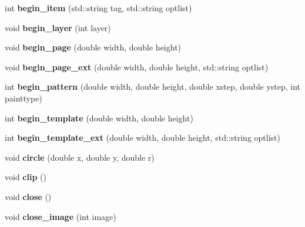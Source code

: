 \begin{DoxyCompactItemize}
\item 
\hypertarget{classPDFlib_a0df23d2d6f9a6a100878bad9b8936e6c}{}\label{classPDFlib_a0df23d2d6f9a6a100878bad9b8936e6c} 
int {\bfseries begin\+\_\+item} (std\+::string tag, std\+::string optlist)
\item 
\hypertarget{classPDFlib_ac35bac599211da4f97c13bf5d752ca4f}{}\label{classPDFlib_ac35bac599211da4f97c13bf5d752ca4f} 
void {\bfseries begin\+\_\+layer} (int layer)
\item 
\hypertarget{classPDFlib_a311dccd5a1ac04646673e6eaeea476ae}{}\label{classPDFlib_a311dccd5a1ac04646673e6eaeea476ae} 
void {\bfseries begin\+\_\+page} (double width, double height)
\item 
\hypertarget{classPDFlib_ac656d2651dab7cd9dc27e6fb7e24674b}{}\label{classPDFlib_ac656d2651dab7cd9dc27e6fb7e24674b} 
void {\bfseries begin\+\_\+page\+\_\+ext} (double width, double height, std\+::string optlist)
\item 
\hypertarget{classPDFlib_a4f448cf3fb5e4376c8f5665b209309b2}{}\label{classPDFlib_a4f448cf3fb5e4376c8f5665b209309b2} 
int {\bfseries begin\+\_\+pattern} (double width, double height, double xstep, double ystep, int painttype)
\item 
\hypertarget{classPDFlib_a0a17dc423a0b09f0fe3da38184a0c58a}{}\label{classPDFlib_a0a17dc423a0b09f0fe3da38184a0c58a} 
int {\bfseries begin\+\_\+template} (double width, double height)
\item 
\hypertarget{classPDFlib_af52208d3c75b94fa260e930379add01e}{}\label{classPDFlib_af52208d3c75b94fa260e930379add01e} 
int {\bfseries begin\+\_\+template\+\_\+ext} (double width, double height, std\+::string optlist)
\item 
\hypertarget{classPDFlib_a829708ea81ca5fdc782b41671d289024}{}\label{classPDFlib_a829708ea81ca5fdc782b41671d289024} 
void {\bfseries circle} (double x, double y, double r)
\item 
\hypertarget{classPDFlib_ac975ffef2d14cd63e59c2721934ccc7c}{}\label{classPDFlib_ac975ffef2d14cd63e59c2721934ccc7c} 
void {\bfseries clip} ()
\item 
\hypertarget{classPDFlib_ae9242dfb19f5367436a6964546d9d4e6}{}\label{classPDFlib_ae9242dfb19f5367436a6964546d9d4e6} 
void {\bfseries close} ()
\item 
\hypertarget{classPDFlib_ac063ee8ba65df5795c8f488a2238cf7f}{}\label{classPDFlib_ac063ee8ba65df5795c8f488a2238cf7f} 
void {\bfseries close\+\_\+image} (int image)
\item 
\hypertarget{classPDFlib_a8b4d6ae7f6df6ac04d54b3f1449849f1}{}\label{classPDFlib_a8b4d6ae7f6df6ac04d54b3f1449849f1} 

\end{DoxyCompactItemize}
